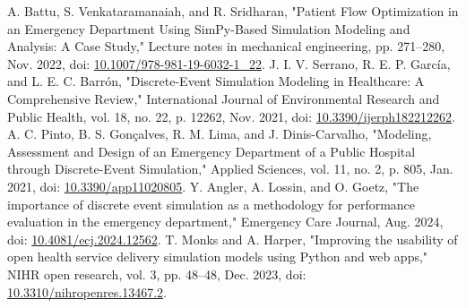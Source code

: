 \documentclass{article}
\begin{document}
\clearpage
\begin{thebibliography}{99}
 A. Battu, S. Venkataramanaiah, and R. Sridharan, "Patient Flow Optimization in an Emergency Department Using SimPy-Based Simulation Modeling and Analysis: A Case Study," Lecture notes in mechanical engineering, pp. 271–280, Nov. 2022, doi: \href{https://doi.org/10.1007/978-981-19-6032-1\_22}{10.1007/978-981-19-6032-1\_22}.
 J. I. V. Serrano, R. E. P. García, and L. E. C. Barrón, "Discrete-Event Simulation Modeling in Healthcare: A Comprehensive Review," International Journal of Environmental Research and Public Health, vol. 18, no. 22, p. 12262, Nov. 2021, doi: \href{https://doi.org/10.3390/ijerph182212262}{10.3390/ijerph182212262}.
 A. C. Pinto, B. S. Gonçalves, R. M. Lima, and J. Dinis-Carvalho, "Modeling, Assessment and Design of an Emergency Department of a Public Hospital through Discrete-Event Simulation," Applied Sciences, vol. 11, no. 2, p. 805, Jan. 2021, doi: \href{https://doi.org/10.3390/app11020805}{10.3390/app11020805}.
 Y. Angler, A. Lossin, and O. Goetz, "The importance of discrete event simulation as a methodology for performance evaluation in the emergency department," Emergency Care Journal, Aug. 2024, doi: \href{https://doi.org/10.4081/ecj.2024.12562}{10.4081/ecj.2024.12562}.
 T. Monks and A. Harper, "Improving the usability of open health service delivery simulation models using Python and web apps," NIHR open research, vol. 3, pp. 48–48, Dec. 2023, doi: \href{https://doi.org/10.3310/nihropenres.13467.2}{10.3310/nihropenres.13467.2}.
\end{thebibliography}
\end{document}
